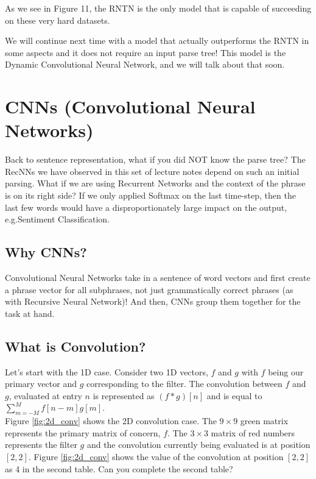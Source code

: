 \documentclass{tufte-handout}
\begin{document}
As we see in Figure 11, the RNTN is the only model that is capable of succeeding on these very hard datasets. 

We will continue next time with a model that actually outperforms the RNTN in some aspects and it does not require an input parse tree! This model is the Dynamic Convolutional Neural Network, and we will talk about that soon. 

\section{CNNs (Convolutional Neural Networks)}
Back to sentence representation, what if you did NOT know the parse tree? The RecNNs we have observed in this set of lecture notes depend on such an initial parsing. What if we are using Recurrent Networks and the context of the phrase is on its right side? If we only applied Softmax on the last time-step, then the last few words would have a disproportionately large impact on the output, e.g.Sentiment Classification.

\subsection{Why CNNs?}
Convolutional Neural Networks take in a sentence of word vectors and first create a phrase vector for all subphrases, not just grammatically correct phrases (as with Recursive Neural Network)! And then, CNNs group them together for the task at hand.

\subsection{What is Convolution?}
Let's start with the 1D case. Consider two 1D vectors, $f$ and $g$ with $f$ being our primary vector and $g$ corresponding to the filter. The convolution between $f$ and $g$, evaluated at entry $n$ is represented as $(f*g)[n]$ and is equal to $\sum\limits_{m=-M}^Mf[n-m]g[m]$. \\
Figure \ref{fig:2d_conv} shows the 2D convolution case. The $9\times 9$ green matrix represents the primary matrix of concern, $f$. The $3\times 3$ matrix of red numbers represents the filter $g$ and the convolution currently being evaluated is at position $[2,2]$. Figure \ref{fig:2d_conv} shows the value of the convolution at position $[2,2]$ as 4 in the second table. Can you complete the second table?
\end{document}
